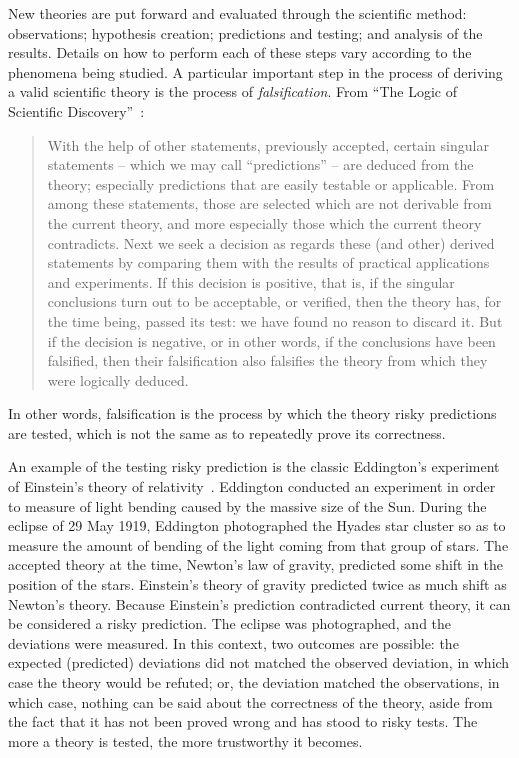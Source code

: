  New theories are put forward and evaluated through the scientific method: observations; hypothesis creation; predictions and testing; and analysis of the results. Details on how to perform each of these steps vary according to the phenomena being studied. A particular important step in the process of deriving a valid scientific theory is the process of \emph{falsification}. From ``The Logic of Scientific Discovery''~\cite{popper-scientificdiscovery}:
 \begin{quote}
With the help of other statements, previously accepted, certain singular statements  --  which we may call ``predictions'' -- are deduced from the theory; especially predictions that are easily testable or applicable. From among these statements, those are selected which are not derivable from the current theory, and more especially those which the current theory contradicts. Next we seek a decision as regards these (and other) derived statements by comparing them with the results of practical applications and experiments. If this decision is positive, that is, if the singular conclusions turn out to be acceptable, or verified, then the theory has, for the time being, passed its test: we have found no reason to discard it. But if the decision is negative, or in other words, if the conclusions have been falsified, then their falsification also falsifies the theory from which they were logically deduced.
 \end{quote}
In other words, falsification is the process by which the theory risky predictions are tested, which is not the same as to repeatedly prove its correctness.
 
An example of the testing risky prediction is the classic Eddington's experiment of Einstein's theory of relativity~\cite{coles2001einstein}. Eddington conducted an experiment in order to measure of light bending caused by the massive size of the Sun.  During the eclipse of 29 May 1919, Eddington photographed the Hyades star cluster so as to measure the amount of bending of the light coming from that group of stars. The accepted theory at the time, Newton's law of gravity, predicted some shift in the position of the stars. Einstein's theory of gravity predicted twice as much shift as Newton's theory. Because Einstein's prediction contradicted current theory, it can be considered a risky prediction.
The eclipse was photographed, and the deviations were measured.  In this context, two outcomes are possible: the expected (predicted) deviations did not matched the observed deviation, in which case the theory would be refuted; or, the deviation matched the observations, in which case, nothing can be said about the correctness of the theory, aside from the fact that it has not been proved wrong and has stood to risky tests. The more a theory is tested, the more trustworthy it becomes. 

